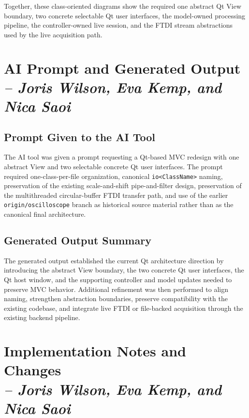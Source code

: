Together, these class-oriented diagrams show the required one abstract Qt View boundary, two concrete selectable Qt user interfaces, the model-owned processing pipeline, the controller-owned live session, and the FTDI stream abstractions used by the live acquisition path.

\section{AI Prompt and Generated Output \\
    \small{\textit{-- Joris Wilson, Eva Kemp, and Nica Saoi}}}
    \label{Section::AI Prompt and Generated Output}

    \subsection{Prompt Given to the AI Tool}
    The AI tool was given a prompt requesting a Qt-based MVC redesign with one abstract View and two selectable concrete Qt user interfaces. The prompt required one-class-per-file organization, canonical \texttt{io<ClassName>} naming, preservation of the existing scale-and-shift pipe-and-filter design, preservation of the multithreaded circular-buffer FTDI transfer path, and use of the earlier \texttt{origin/oscilloscope} branch as historical source material rather than as the canonical final architecture.

    \subsection{Generated Output Summary}
    The generated output established the current Qt architecture direction by introducing the abstract View boundary, the two concrete Qt user interfaces, the Qt host window, and the supporting controller and model updates needed to preserve MVC behavior. Additional refinement was then performed to align naming, strengthen abstraction boundaries, preserve compatibility with the existing codebase, and integrate live FTDI or file-backed acquisition through the existing backend pipeline.

    \section{Implementation Notes and Changes \\
    \small{\textit{-- Joris Wilson, Eva Kemp, and Nica Saoi}}}
    \label{Section::Implementation Notes and Changes}

